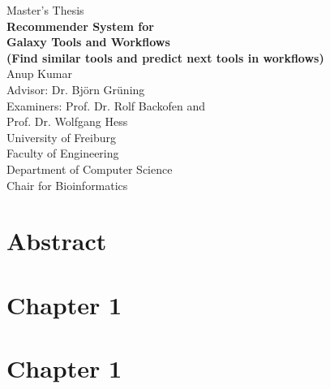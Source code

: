 \documentclass[12pt]{report}
\begin{document}
\begin{titlepage}

\begin{center}
{\Large Master's Thesis}\\[2cm]
{\huge \bfseries Recommender System for }\\[0.25cm]
{\huge \bfseries Galaxy Tools and Workflows }\\[0.25cm]
{\Large \bfseries (Find similar tools and predict next tools in workflows) }\\[2cm]
{\Large Anup Kumar} \\[2cm]
{\Large Advisor:  Dr. Björn Grüning }\\[0.5cm]
{\Large Examiners: Prof. Dr. Rolf Backofen and }\\[0.25cm]
{\Large Prof. Dr. Wolfgang Hess }\\ [2cm]
{\Large University of Freiburg }\\[0.25cm]
{\Large Faculty of Engineering }\\[0.25cm]
{\Large Department of Computer Science }\\[0.25cm]
{\Large Chair for Bioinformatics }\\[2cm]


\end{center}
\end{titlepage}


\newpage


\newpage


\newpage
\tableofcontents
\newpage

\section{Abstract}


\newpage
\section{Chapter 1}



\section{Chapter 1}
\end{document}
